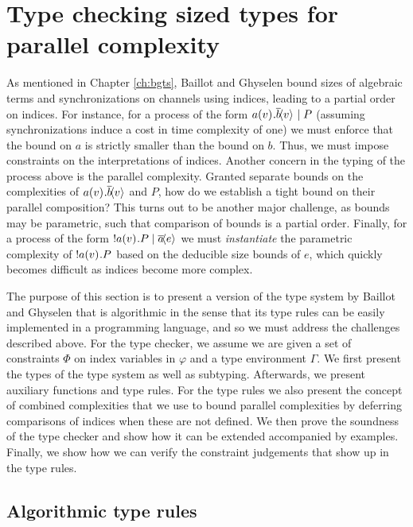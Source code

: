 \section{Type checking sized types for parallel complexity}\label{ch:typecheck}
As mentioned in Chapter \ref{ch:bgts}, Baillot and Ghyselen \cite{BaillotGhyselen2021} bound sizes of algebraic terms and synchronizations on channels using indices, leading to a partial order on indices. For instance, for a process of the form $a(v)^{}.\overline{b}\!\langle v\rangle^{} \mid P$ (assuming synchronizations induce a cost in time complexity of one) we must enforce that the bound on $a$ is strictly smaller than the bound on $b$. Thus, we must impose constraints on the interpretations of indices. Another concern in the typing of the process above is the parallel complexity. Granted separate bounds on the complexities of $a(v)^{}.\overline{b}\!\langle v\rangle^{}$ and $P$, how do we establish a tight bound on their parallel composition? This turns out to be another major challenge, as bounds may be parametric, such that comparison of bounds is a partial order. Finally, for a process of the form $!a(v)^{}.P \mid \overline{a}\!\langle e\rangle^{}$ we must \textit{instantiate} the parametric complexity of $!a(v)^{}.P$ based on the deducible size bounds of $e$, which quickly becomes difficult as indices become more complex. 

The purpose of this section is to present a version of the type system by Baillot and Ghyselen that is algorithmic in the sense that its type rules can be easily implemented in a programming language, and so we must address the challenges described above. For the type checker, we assume we are given a set of constraints $\Phi$ on index variables in $\varphi$ and a type environment $\Gamma$. We first present the types of the type system as well as subtyping. Afterwards, we present auxiliary functions and type rules. For the type rules we also present the concept of combined complexities that we use to bound parallel complexities by deferring comparisons of indices when these are not defined. We then prove the soundness of the type checker and show how it can be extended accompanied by examples. Finally, we show how we can verify the constraint judgements that show up in the type rules.

% 

\subsection{Algorithmic type rules}\label{section:typeruless}

